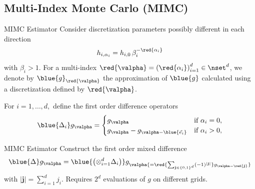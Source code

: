 \subsection{Multi-Index Monte Carlo (MIMC)}
\begin{frame}{MIMC Estimator}
Consider discretization parameters possibly different in each direction
\[
   {h_{i,\alpha_i} = h_{i,0}\, \beta_i^{-\red{\alpha_i}}}
\]
with $\beta_i > 1$. For a multi-index $\red{\valpha} = \left( \red{\alpha_i} \right)_{i=1}^d \in \nset^d$, we denote by $\blue{g}_{\red{\valpha}}$ the approximation  of $\blue{g}$ calculated using a discretization defined by
$\red{\valpha}$.

\medskip
For $i=1,\ldots,d,$ define the first order  difference operators
  \begin{align*}
    \blue{\Delta_i}  g_\valpha = \begin{cases}
       g_\valpha & \text{if } \alpha_i=0, \\
       g_{\valpha} -  g_{\valpha-\blue{\vec e_i}} & \text{if } \alpha_i > 0,
      \end{cases}
    \end{align*}
  \end{frame}
  \begin{frame}{MIMC Estimator}
    Construct the first order mixed difference
    \[
      \blue{\Delta}  g_\valpha =\blue{\left( \otimes_{i=1}^d  \Delta_i\right)}
      g_\valpha {=\red{\sum_{\mathbf{j}\in\{0,1\}^d} (-1)^{|\mathbf{j}|}} g_{\valpha-\red{\mathbf{j}}}}
    \]
    with $|\mathbf{j}| = \sum_{i=1}^d j_i$. Requires $2^d$ evaluations
    of $g$ on different grids.
\end{frame}

